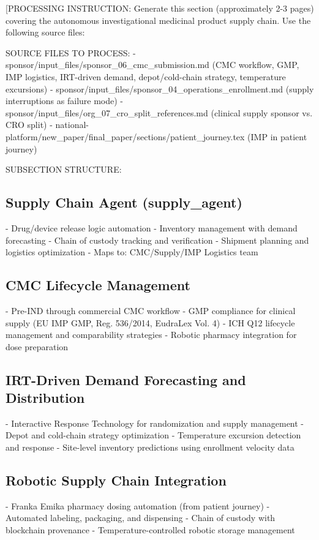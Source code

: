 
[PROCESSING INSTRUCTION: Generate this section (approximately 2-3 pages) covering the
autonomous investigational medicinal product supply chain. Use the following source files:

SOURCE FILES TO PROCESS:
- sponsor/input\_files/sponsor\_06\_cmc\_submission.md (CMC workflow, GMP, IMP logistics,
  IRT-driven demand, depot/cold-chain strategy, temperature excursions)
- sponsor/input\_files/sponsor\_04\_operations\_enrollment.md (supply interruptions as failure mode)
- sponsor/input\_files/org\_07\_cro\_split\_references.md (clinical supply sponsor vs. CRO split)
- national-platform/new\_paper/final\_paper/sections/patient\_journey.tex (IMP in patient journey)

SUBSECTION STRUCTURE:

\subsection{Supply Chain Agent (supply\_agent)}
- Drug/device release logic automation
- Inventory management with demand forecasting
- Chain of custody tracking and verification
- Shipment planning and logistics optimization
- Maps to: CMC/Supply/IMP Logistics team

\subsection{CMC Lifecycle Management}
- Pre-IND through commercial CMC workflow
- GMP compliance for clinical supply (EU IMP GMP, Reg. 536/2014, EudraLex Vol. 4)
- ICH Q12 lifecycle management and comparability strategies
- Robotic pharmacy integration for dose preparation

\subsection{IRT-Driven Demand Forecasting and Distribution}
- Interactive Response Technology for randomization and supply management
- Depot and cold-chain strategy optimization
- Temperature excursion detection and response
- Site-level inventory predictions using enrollment velocity data

\subsection{Robotic Supply Chain Integration}
- Franka Emika pharmacy dosing automation (from patient journey)
- Automated labeling, packaging, and dispensing
- Chain of custody with blockchain provenance
- Temperature-controlled robotic storage management


